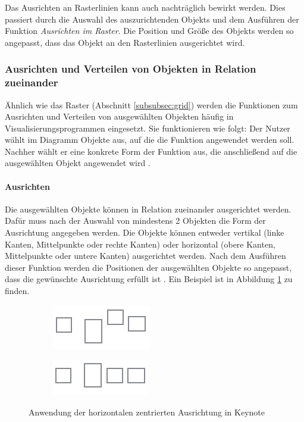 Das Ausrichten an Rasterlinien kann auch nachträglich bewirkt werden. Dies passiert durch die Auswahl des auszurichtenden Objekts und dem Ausführen der Funktion \textit{Ausrichten im Raster}. Die Position und Größe des Objekts werden so angepasst, dass das Objekt an den Rasterlinien ausgerichtet wird.

\subsubsection{Ausrichten und Verteilen von Objekten in Relation zueinander}
\label{subsubsec:alignment-and-distribution}

Ähnlich wie das Raster (Abschnitt \ref{subsubsec:grid}) werden die Funktionen zum Ausrichten und Verteilen von ausgewählten Objekten häufig in Visualisierungsprogrammen eingesetzt. Sie funktionieren wie folgt: Der Nutzer wählt im Diagramm Objekte aus, auf die die Funktion angewendet werden soll. Nachher wählt er eine konkrete Form der Funktion aus, die anschließend auf die ausgewählten Objekt angewendet wird \cite{11Keynote}.

\paragraph{Ausrichten}

Die ausgewählten Objekte können in Relation zueinander ausgerichtet werden. Dafür muss nach der Auswahl von mindestens 2 Objekten die Form der Ausrichtung angegeben werden. Die Objekte können entweder vertikal (linke Kanten, Mittelpunkte oder rechte Kanten) oder horizontal (obere Kanten, Mittelpunkte oder untere Kanten) ausgerichtet werden. Nach dem Ausführen dieser Funktion werden die Positionen der ausgewählten Objekte so angepasst, dass die gewünschte Ausrichtung erfüllt ist \cite{11Keynote, 08OmniGraffle}. Ein Beispiel ist in Abbildung \ref{fig:keynote-horizontal-alignment} zu finden.

\begin{figure}[hbt]
    \newcommand{\subfigurewidth}{0.5\textwidth}
    \begin{subfigure}{\subfigurewidth}
        \centering
        \includegraphics{resources/keynote-horizontal-alignment-a}
        \caption{}
    \end{subfigure}
    \begin{subfigure}{\subfigurewidth}
        \centering
        \includegraphics{resources/keynote-horizontal-alignment-b}
        \caption{}
    \end{subfigure}
    \caption{Anwendung der horizontalen zentrierten Ausrichtung in Keynote}
    \label{fig:keynote-horizontal-alignment}
\end{figure}

